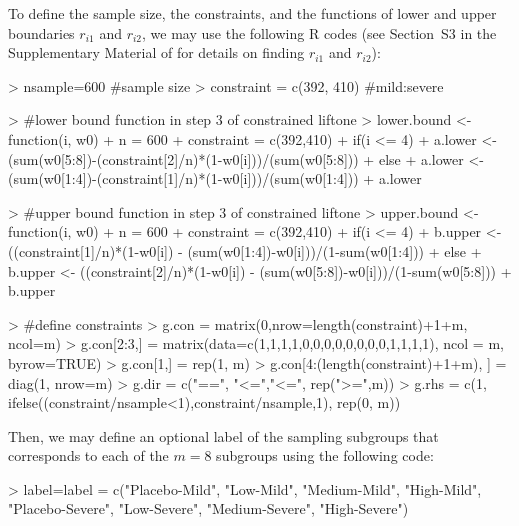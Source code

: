 To define the sample size, the constraints, and the functions of lower and upper boundaries $r_{i1}$ and $r_{i2}$, we may use the following R codes (see Section~S3 in the Supplementary Material of \cite{huang2023constrained} for details on finding $r_{i1}$ and $r_{i2}$):
\begin{example}
  > nsample=600 #sample size
  > constraint = c(392, 410)  #mild:severe

  > #lower bound function in step 3 of constrained liftone
  > lower.bound <- function(i, w0){
    +   n = 600
    +   constraint = c(392,410)
    +   if(i <= 4){
    +     a.lower <- (sum(w0[5:8])-(constraint[2]/n)*(1-w0[i]))/(sum(w0[5:8]))}
    +   else{
    +     a.lower <- (sum(w0[1:4])-(constraint[1]/n)*(1-w0[i]))/(sum(w0[1:4]))}
  +    a.lower}

  > #upper bound function in step 3 of constrained liftone
  > upper.bound <- function(i, w0){
    +  n = 600
    +  constraint = c(392,410)
    +  if(i <= 4){
    +    b.upper <- ((constraint[1]/n)*(1-w0[i]) - (sum(w0[1:4])-w0[i]))/(1-sum(w0[1:4]))}
    +  else{
    +    b.upper <- ((constraint[2]/n)*(1-w0[i]) - (sum(w0[5:8])-w0[i]))/(1-sum(w0[5:8]))}
  +    b.upper}

  > #define constraints
  > g.con = matrix(0,nrow=length(constraint)+1+m, ncol=m)
  > g.con[2:3,] = matrix(data=c(1,1,1,1,0,0,0,0,0,0,0,0,1,1,1,1), ncol = m, byrow=TRUE)
  > g.con[1,] = rep(1, m)
  > g.con[4:(length(constraint)+1+m), ] = diag(1, nrow=m)
  > g.dir = c("==", "<=","<=", rep(">=",m))
  > g.rhs = c(1, ifelse((constraint/nsample<1),constraint/nsample,1), rep(0, m))
\end{example}

Then, we may define an optional label of the sampling subgroups that corresponds to each of the $m=8$ subgroups using the following code:

\begin{example}
  > label=label = c("Placebo-Mild", "Low-Mild", "Medium-Mild", "High-Mild",
  "Placebo-Severe", "Low-Severe", "Medium-Severe", "High-Severe")
\end{example}


